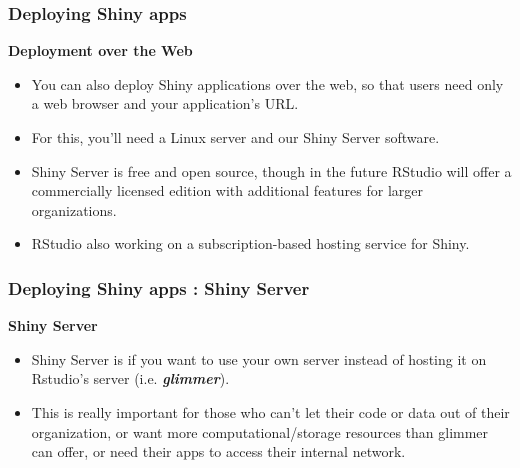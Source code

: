 \documentclass{beamer}
\begin{document}
\begin{frame}
\frametitle{Deploying Shiny apps}
\Large
\textbf{Deployment over the Web}
\begin{itemize}
\item You can also deploy Shiny applications over the web, so that users need only a web browser and your application’s URL.
\item For this, you’ll need a Linux server and our Shiny Server software. 
\item Shiny Server is free and open source, though in the future RStudio will offer a commercially licensed edition with additional features for larger organizations.
\item RStudio also working on a subscription-based hosting service for Shiny. 
\end{itemize}
\end{frame}

\begin{frame}
\frametitle{Deploying Shiny apps : Shiny Server}
\Large
\textbf{Shiny Server}
\begin{itemize}


\item Shiny Server is if you want to use your own server instead of hosting it on Rstudio's server (i.e. \textbf{\textit{glimmer}}). 

\item  This is really important for those who can't let their code or data out of their organization, 
or want more computational/storage resources than glimmer can offer, or need their apps to access their 
internal network.
\end{itemize}
\end{frame}
\end{document}
